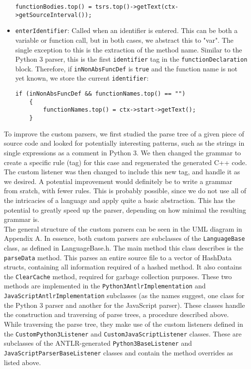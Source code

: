\documentclass[../Main.tex]{subfiles}
\begin{document}
\begin{itemize}
\begin{lstlisting}
functionBodies.top() = tsrs.top()->getText(ctx->getSourceInterval());
    \end{lstlisting}
    \item \texttt{enterIdentifier}: Called when an identifier is entered. This can be both a variable or function call, but in both cases, we abstract this to "var". The single exception to this is the extraction of the method name. Similar to the Python 3 parser, this is the first \texttt{identifier} tag in the \texttt{functionDeclaration} block. Therefore, if \texttt{inNonAbsFuncDef} is \texttt{true} and the function name is not yet known, we store the current \texttt{identifier}:
    \begin{lstlisting}
if (inNonAbsFuncDef && functionNames.top() == "")
	{
		functionNames.top() = ctx->start->getText();
	}
    \end{lstlisting}
\end{itemize}

To improve the custom parsers, we first studied the parse tree of a given piece of source code and looked for potentially interesting patterns, such as the strings in single expressions as a comment in Python 3. We then changed the grammar to create a specific rule (tag) for this case and regenerated the generated C++ code. The custom listener was then changed to include this new tag, and handle it as we desired. A potential improvement would definitely be to write a grammar from sratch, with fewer rules. This is probably possible, since we do not use all of the intricacies of a language and apply quite a basic abstraction. This has the potential to greatly speed up the parser, depending on how minimal the resulting grammar is.\\

The general structure of the custom parsers can be seen in the UML diagram in Appendix A. In essence, both custom parsers are subclasses of the \texttt{LanguageBase} class, as defined in LanguageBase.h. The main method this class describes is the \texttt{parseData} method. This parses an entire source file to a vector of HashData structs, containing all information required of a hashed method. It also contains the \texttt{ClearCache} method, required for garbage collection purposes. These two methods are implemented in the \texttt{Python3AntlrImplementation} and \texttt{JavaScriptAntlrImplementation} subclasses (as the names suggest, one class for the Python 3 parser and another for the JavaScript parser). These classes handle the construction and traversing of parse trees, a procedure described above. While traversing the parse tree, they make use of the custom listeners defined in the \texttt{CustomPython3Listener} and \texttt{CustomJavaScriptListener} classes. These are subclasses of the ANTLR-generated \texttt{Python3BaseListener} and \texttt{JavaScriptParserBaseListener} classes and contain the method overrides as listed above.
\end{document}
